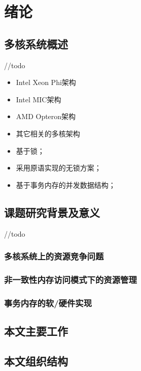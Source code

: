 \chapter{绪\quad 论}

\section{多核系统概述}

//todo

\begin{itemize}
  \item Intel Xeon Phi架构
  \item Intel MIC架构
  \item AMD Opteron架构
  \item 其它相关的多核架构
\end{itemize}


\begin{itemize}
  \item 基于锁；
  \item 采用原语实现的无锁方案；
  \item 基于事务内存的并发数据结构；
\end{itemize}


\section{课题研究背景及意义}

//todo

\subsection{多核系统上的资源竞争问题}
\label{sec:}


\subsection{非一致性内存访问模式下的资源管理}
\label{sec:}

\subsection{事务内存的软/硬件实现}


\section{本文主要工作}


\section{本文组织结构}

